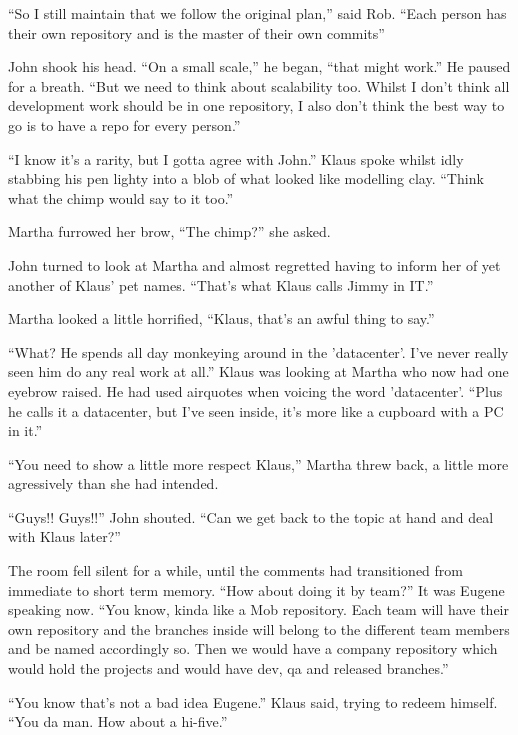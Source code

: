 \begin{trenches}
``So I still maintain that we follow the original plan,'' said Rob.  ``Each person has their own repository and is the master of their own commits''

John shook his head.  ``On a small scale,'' he began, ``that might work.''  He paused for a breath.  ``But we need to think about scalability too.  Whilst I don't think all development work should be in one repository, I also don't think the best way to go is to have a repo for every person.''

``I know it's a rarity, but I gotta agree with John.''  Klaus spoke whilst idly stabbing his pen lighty into a blob of what looked like modelling clay.  ``Think what the chimp would say to it too.''

Martha furrowed her brow, ``The chimp?'' she asked.

John turned to look at Martha and almost regretted having to inform her of yet another of Klaus' pet names.  ``That's what Klaus calls Jimmy in IT.''  

Martha looked a little horrified, ``Klaus, that's an awful thing to say.''  

``What?  He spends all day monkeying around in the 'datacenter'.  I've never really seen him do any real work at all.''  Klaus was looking at Martha who now had one eyebrow raised.  He had used airquotes when voicing the word 'datacenter'.  ``Plus he calls it a datacenter, but I've seen inside, it's more like a cupboard with a PC in it.''

``You need to show a little more respect Klaus,'' Martha threw back, a little more agressively than she had intended.

``Guys!! Guys!!''  John shouted.  ``Can we get back to the topic at hand and deal with Klaus later?''

The room fell silent for a while, until the comments had transitioned from immediate to short term memory.  ``How about doing it by team?''  It was Eugene speaking now.  ``You know, kinda like a Mob repository.  Each team will have their own repository and the branches inside will belong to the different team members and be named accordingly so.  Then we would have a company repository which would hold the projects and would have dev, qa and released branches.''

``You know that's not a bad idea Eugene.''  Klaus said, trying to redeem himself.  ``You da man.  How about a hi-five.''

\end{trenches}

